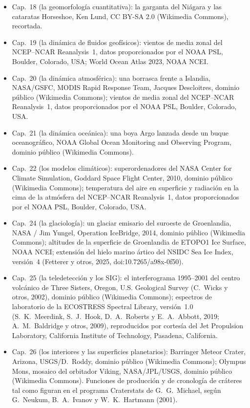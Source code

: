 \begin{itemize}
  \item Cap.~18 (la geomorfología cuantitativa): la garganta del Niágara y las cataratas Horseshoe, Ken Lund, CC BY-SA 2.0 (Wikimedia Commons), recortada.
  \item Cap.~19 (la dinámica de fluidos geofísicos): vientos de media zonal del NCEP--NCAR Reanalysis~1, datos proporcionados por el NOAA PSL, Boulder, Colorado, USA; World Ocean Atlas 2023, NOAA NCEI.
  \item Cap.~20 (la dinámica atmosférica): una borrasca frente a Islandia, NASA/GSFC, MODIS Rapid Response Team, Jacques Descloitres, dominio público (Wikimedia Commons); vientos de media zonal del NCEP--NCAR Reanalysis~1, datos proporcionados por el NOAA PSL, Boulder, Colorado, USA.
  \item Cap.~21 (la dinámica oceánica): una boya Argo lanzada desde un buque oceanográfico, NOAA Global Ocean Monitoring and Observing Program, dominio público (Wikimedia Commons).
  \item Cap.~22 (los modelos climáticos): superordenadores del NASA Center for Climate Simulation, Goddard Space Flight Center, 2010, dominio público (Wikimedia Commons); temperatura del aire en superficie y radiación en la cima de la atmósfera del NCEP--NCAR Reanalysis~1, datos proporcionados por el NOAA PSL, Boulder, Colorado, USA.
  \item Cap.~24 (la glaciología): un glaciar emisario del suroeste de Groenlandia, NASA / Jim Yungel, Operation IceBridge, 2014, dominio público (Wikimedia Commons); altitudes de la superficie de Groenlandia de ETOPO1 Ice Surface, NOAA NCEI; extensión del hielo marino ártico del NSIDC Sea Ice Index, versión~4 (Fetterer y otros, 2025, doi:10.7265/a98x-0f50).
  \item Cap.~25 (la teledetección y los SIG): el interferograma 1995--2001 del centro volcánico de Three Sisters, Oregon, U.S. Geological Survey (C.~Wicks y otros, 2002), dominio público (Wikimedia Commons); espectros de laboratorio de la ECOSTRESS Spectral Library, versión~1.0 (S.~K.~Meerdink, S.~J.~Hook, D.~A.~Roberts y E.~A.~Abbott, 2019; A.~M.~Baldridge y otros, 2009), reproducidos por cortesía del Jet Propulsion Laboratory, California Institute of Technology, Pasadena, California.
  \item Cap.~26 (los interiores y las superficies planetarios): Barringer Meteor Crater, Arizona, USGS/D.~Roddy, dominio público (Wikimedia Commons); Olympus Mons, mosaico del orbitador Viking, NASA/\allowbreak JPL/\allowbreak USGS, dominio público (Wikimedia Commons). Funciones de producción y de cronología de cráteres tal como figuran en el programa Craterstats de G.~G.~Michael, según G.~Neukum, B.~A.~Ivanov y W.~K.~Hartmann (2001).

\end{itemize}
